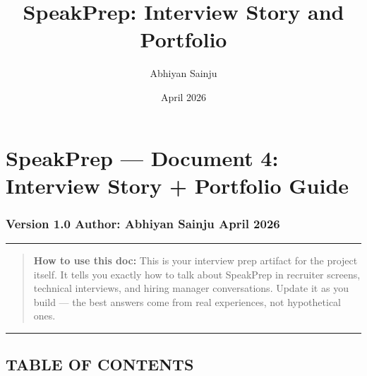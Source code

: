 \documentclass[
  11pt,
]{article}
\title{SpeakPrep: Interview Story and Portfolio}
\author{Abhiyan Sainju}
\date{April 2026}
\begin{document}
\maketitle

\hypertarget{speakprep-document-4-interview-story-portfolio-guide}{%
\section{SpeakPrep --- Document 4: Interview Story + Portfolio
Guide}\label{speakprep-document-4-interview-story-portfolio-guide}}

\hypertarget{version-1.0-author-abhiyan-sainju-april-2026}{%
\subsubsection{Version 1.0 \textbar{} Author: Abhiyan Sainju \textbar{}
April 2026}\label{version-1.0-author-abhiyan-sainju-april-2026}}

\begin{center}\rule{0.5\linewidth}{0.5pt}\end{center}

\begin{quote}
\textbf{How to use this doc:} This is your interview prep artifact for
the project itself. It tells you exactly how to talk about SpeakPrep in
recruiter screens, technical interviews, and hiring manager
conversations. Update it as you build --- the best answers come from
real experiences, not hypothetical ones.
\end{quote}

\begin{center}\rule{0.5\linewidth}{0.5pt}\end{center}

\hypertarget{table-of-contents}{%
\subsection{TABLE OF CONTENTS}\label{table-of-contents}}
\end{document}
